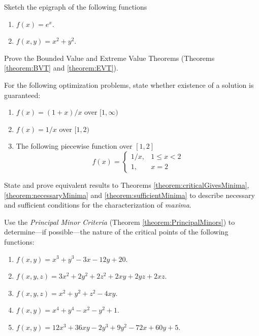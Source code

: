 \begin{problem}[Intermediate]\cite[p.79 \#11]{peressini1988mathematics}
Sketch the epigraph of the following functions
\begin{enumerate}
	\item $f(x) = e^x$.
	\item $f(x,y)=x^2+y^2$.
\end{enumerate}
\end{problem}


\begin{problem}[Advanced]
Prove the Bounded Value and Extreme Value Theorems (Theorems \ref{theorem:BVT} and \ref{theorem:EVT}).
\end{problem}

\begin{problem}[Intermediate]
For the following optimization problems, state whether existence of a solution is guaranteed:
\begin{enumerate}
	\item $f(x) = (1+x)/x$ over $[1,\infty)$
	\item $f(x) = 1/x$ over $[1,2)$
	\item The following piecewise function over $[1,2]$
	\begin{equation*}
	f(x) = \begin{cases}
	1/x, &1\leq x<2 \\
	1,   &x=2
	\end{cases}
	\end{equation*}
\end{enumerate}
\end{problem}


\begin{problem}[Advanced]
State and prove equivalent results to Theorems \ref{theorem:criticalGivesMinima}, \ref{theorem:necessaryMinima} and \ref{theorem:sufficientMinima} to describe necessary and sufficient conditions for the characterization of \emph{maxima}.
\end{problem}

\begin{problem}[Basic]\cite[p.32, \#7]{peressini1988mathematics}
Use the \emph{Principal Minor Criteria} (Theorem \ref{theorem:PrincipalMinors}) to determine---if possible---the nature of the critical points of the following functions:
\begin{enumerate}
	\item $f(x,y) = x^3+y^3-3x-12y+20$.
	\item $f(x,y,z) = 3x^2+2y^2+2z^2+2xy+2yz+2xz$.
	\item $f(x,y,z) = x^2+y^2+z^2-4xy$.
	\item $f(x,y) = x^4+y^4-x^2-y^2+1$.
	\item $f(x,y) = 12x^3+36xy-2y^3+9y^2-72x+60y+5$.
\end{enumerate}
\end{problem}

